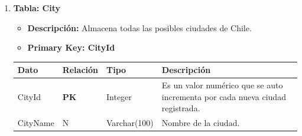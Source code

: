 \documentclass[12pt]{article}
\begin{document}
\begin{enumerate}
    \item \textbf{Tabla: City}
    \begin{itemize}
        \item \textbf{Descripción:} Almacena todas las posibles ciudades de Chile.
        \item \textbf{Primary Key: CityId}
    \end{itemize}
    \begin{table}[!h]
        \centering
        \begin{tabular}{|p{3cm}|p{2cm}|p{2.5cm}|p{8cm}|}
             \hline
             \textbf{Dato} & \textbf{Relación} & \textbf{Tipo} & \textbf{Descripción} \\
             \hline
             CityId & \textbf{PK} & Integer & Es un valor numérico que se auto incrementa por cada nueva ciudad registrada. \\
             \hline
             CityName & N & Varchar(100) & Nombre de la ciudad.\\
             \hline
        \end{tabular}
    \end{table}


\end{enumerate}
\end{document}
